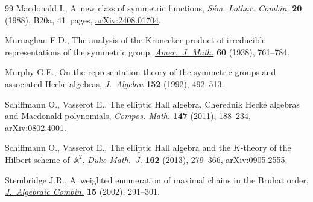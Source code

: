 \documentclass[10pt,a4paper]{amsart}
\numberwithin{equation}{section}
\theoremstyle{definition}
\begin{document}
\begin{thebibliography}{99}
Macdonald I., A~new class of symmetric functions, \textit{S\'em. Lothar.
 Combin.} \textbf{20} (1988), B20a, 41~pages,
 \href{http://arxiv.org/abs/2408.01704}{arXiv:2408.01704}.

Murnaghan F.D., The analysis of the {K}ronecker product of irreducible
 representations of the symmetric group,
 \href{https://doi.org/10.2307/2371610}{\textit{Amer.~J. Math.}} \textbf{60}
 (1938), 761--784.

Murphy G.E., On the representation theory of the symmetric groups and
 associated {H}ecke algebras,
 \href{https://doi.org/10.1016/0021-8693(92)90045-N}{\textit{J.~Algebra}}
 \textbf{152} (1992), 492--513.

Schiffmann O., Vasserot E., The elliptic {H}all algebra, {C}herednik {H}ecke
 algebras and {M}acdonald polynomials,
 \href{https://doi.org/10.1112/S0010437X10004872}{\textit{Compos. Math.}}
 \textbf{147} (2011), 188--234,
 \href{http://arxiv.org/abs/0802.4001}{arXiv:0802.4001}.

Schiffmann O., Vasserot E., The elliptic {H}all algebra and the {$K$}-theory of
 the {H}ilbert scheme of~{${\mathbb A}^2$},
 \href{https://doi.org/10.1215/00127094-1961849}{\textit{Duke Math.~J.}}
 \textbf{162} (2013), 279--366,
 \href{http://arxiv.org/abs/0905.2555}{arXiv:0905.2555}.

Stembridge J.R., A~weighted enumeration of maximal chains in the {B}ruhat
 order, \href{https://doi.org/10.1023/A:1015068609503}{\textit{J.~Algebraic
 Combin.}} \textbf{15} (2002), 291--301.

\end{thebibliography}
\end{document}
